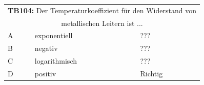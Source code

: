 \begin{frame}
	\begin{small}	
	\begin{tabular}{|l|l|l|}
	\hline
		\multicolumn{3}{|c|}{\textbf{TB104:} Der Temperaturkoeffizient für den Widerstand von}\\
		\multicolumn{3}{|c|}{ metallischen Leitern ist ...}\\
		\hline
		A & exponentiell & ??? \\ \hline
		B & negativ & ??? \\ \hline
		C & logarithmisch & ??? \\ \hline
		D & positiv & Richtig \\ \hline 		
	\end{tabular}
	\end{small}
\end{frame}

